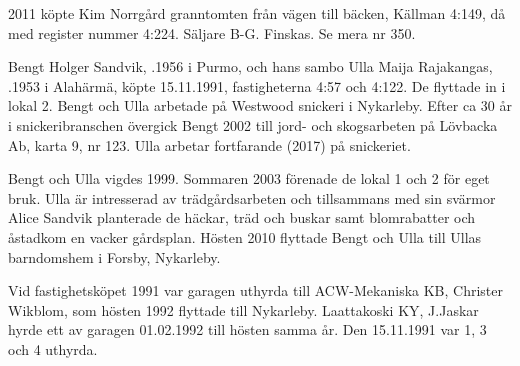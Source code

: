 2011 köpte Kim Norrgård granntomten från vägen till bäcken, Källman 4:149, då med register nummer 4:224. Säljare  B-G. Finskas. Se mera nr 350.


%
Bengt Holger Sandvik, .1956 i Purmo, och hans 	sambo	Ulla Maija Rajakangas, .1953 i Alahärmä, köpte 15.11.1991, fastigheterna 4:57 och 4:122. De flyttade in i lokal 2.	Bengt och Ulla arbetade på Westwood snickeri i Nykarleby. Efter ca 30 år i snickeribranschen övergick Bengt 2002 till jord- och skogsarbeten på Lövbacka Ab, karta 9, nr 123. Ulla arbetar fortfarande (2017) på snickeriet.

Bengt och Ulla vigdes 1999. Sommaren 2003 förenade de lokal 1 och 2 för eget bruk. Ulla är intresserad av trädgårdsarbeten och tillsammans med sin svärmor Alice Sandvik planterade de häckar, träd och buskar samt blomrabatter och åstadkom en vacker gårdsplan. Hösten 2010 flyttade Bengt och Ulla till Ullas barndomshem i Forsby, Nykarleby.


Vid fastighetsköpet 1991 var garagen uthyrda till ACW-Mekaniska KB, Christer Wikblom, som hösten 1992 flyttade till Nykarleby. Laattakoski KY, J.Jaskar hyrde ett av garagen 01.02.1992 till hösten samma år. Den 15.11.1991 var 1, 3 och 4 uthyrda.

